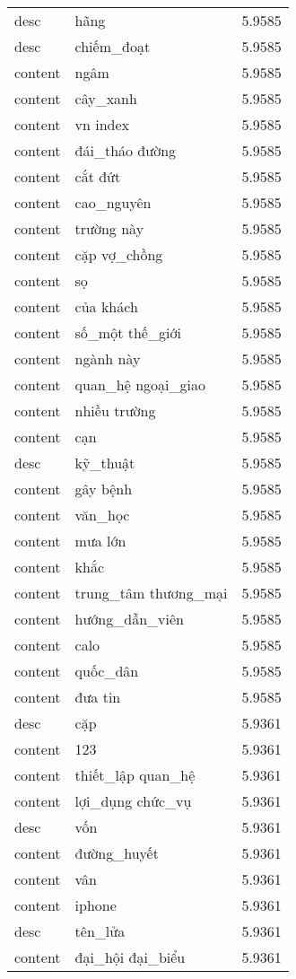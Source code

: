 \documentclass{article}
\begin{document}
\begin{tabular}{lll}
desc & hãng & 5.9585\\
desc & chiếm\_đoạt & 5.9585\\
content & ngâm & 5.9585\\
content & cây\_xanh & 5.9585\\
content & vn index & 5.9585\\
content & đái\_tháo đường & 5.9585\\
content & cắt đứt & 5.9585\\
content & cao\_nguyên & 5.9585\\
content & trường này & 5.9585\\
content & cặp vợ\_chồng & 5.9585\\
content & sọ & 5.9585\\
content & của khách & 5.9585\\
content & số\_một thế\_giới & 5.9585\\
content & ngành này & 5.9585\\
content & quan\_hệ ngoại\_giao & 5.9585\\
content & nhiều trường & 5.9585\\
content & cạn & 5.9585\\
desc & kỹ\_thuật & 5.9585\\
content & gây bệnh & 5.9585\\
content & văn\_học & 5.9585\\
content & mưa lớn & 5.9585\\
content & khắc & 5.9585\\
content & trung\_tâm thương\_mại & 5.9585\\
content & hướng\_dẫn\_viên & 5.9585\\
content & calo & 5.9585\\
content & quốc\_dân & 5.9585\\
content & đưa tin & 5.9585\\
desc & cặp & 5.9361\\
content & 123 & 5.9361\\
content & thiết\_lập quan\_hệ & 5.9361\\
content & lợi\_dụng chức\_vụ & 5.9361\\
desc & vốn & 5.9361\\
content & đường\_huyết & 5.9361\\
content & vân & 5.9361\\
content & iphone & 5.9361\\
desc & tên\_lửa & 5.9361\\
content & đại\_hội đại\_biểu & 5.9361\\

\end{tabular}
\end{document}
